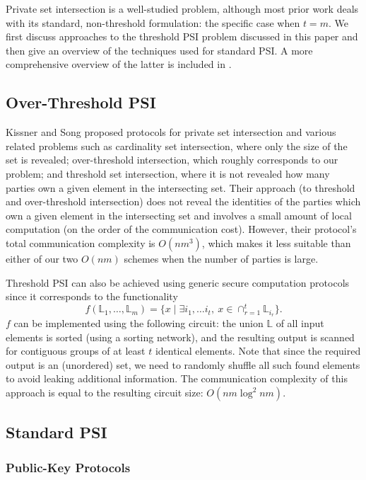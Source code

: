 Private set intersection is a well-studied problem, although most
prior work deals with its standard, non-threshold formulation: the
specific case when $t=m$. We first discuss approaches to the threshold
PSI problem discussed in this paper and then give an overview of the
techniques used for standard PSI. A more comprehensive overview of
the latter is included in \cite{Pinkas}.

\subsection{Over-Threshold PSI}

Kissner and Song \cite{Kissner} proposed protocols for private set intersection
and various related problems such as cardinality set intersection,
where only the size of the set is revealed; over-threshold intersection,
which roughly corresponds to our problem; and threshold set intersection,
where it is not revealed how many parties own a given element in the
intersecting set. Their approach (to threshold and over-threshold
intersection) does not reveal the identities of the parties which
own a given element in the intersecting set and involves a small amount
of local computation (on the order of the communication cost). However,
their protocol's total communication complexity is $O(nm^{3})$, which
makes it less suitable than either of our two $O(nm)$ schemes when
the number of parties is large.

Threshold PSI can also be achieved using generic secure computation
protocols since it corresponds to the functionality
\[
f(\mathbb{L}_{1},\ldots,\mathbb{L}_{m})=\{x\mid\exists i_{1},\ldots i_{t},\ x\in\cap_{r=1}^{t}\mathbb{L}_{i_{r}}\}.
\]
$f$ can be implemented using the following circuit: the union $\mathbb{L}$
of all input elements is sorted (using a sorting network), and the
resulting output is scanned for contiguous groups of at least $t$
identical elements. Note that since the required output is an (unordered)
set, we need to randomly shuffle all such found elements to avoid
leaking additional information. The communication complexity of this
approach is equal to the resulting circuit size: $O(nm\log^{2}nm)$. 

\subsection{Standard PSI }

\subsubsection{Public-Key Protocols}

